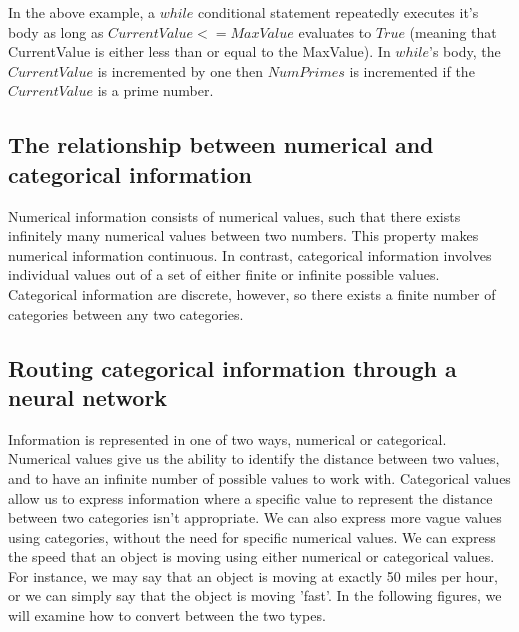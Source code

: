 \documentclass{article}
\begin{document}
	In the above example, a $while$ conditional statement repeatedly executes it's body as long as $CurrentValue <= MaxValue$ evaluates to $True$ (meaning that CurrentValue is either less than or equal to the MaxValue). In $while$'s body, the $CurrentValue$ is incremented by one then $NumPrimes$ is incremented if the $CurrentValue$ is a prime number. 
	
	
	
	\subsection{The relationship between numerical and categorical information}
	
	Numerical information consists of numerical values, such that there exists infinitely many numerical values between two numbers. This property makes numerical information continuous. In contrast, categorical information involves individual values out of a set of either finite or infinite possible values. Categorical information are discrete, however, so there exists a finite number of categories between any two categories.
	
	
	\subsection{Routing categorical information through a neural network}
	
	Information is represented in one of two ways, numerical or categorical. Numerical values give us the ability to identify the distance between two values, and to have an infinite number of possible values to work with. Categorical values allow us to express information where a specific value to represent the distance between two categories isn't appropriate. We can also express more vague values using categories, without the need for specific numerical values.
	We can express the speed that an object is moving using either numerical or categorical values. For instance, we may say that an object is moving at exactly 50 miles per hour, or we can simply say that the object is moving 'fast'. In the following figures, we will examine how to convert between the two types.
	
\end{document}
